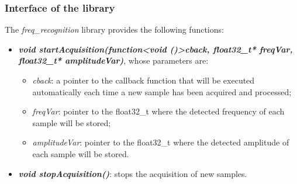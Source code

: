 \subsubsection{Interface of the library}
The \textit{freq\_recognition} library provides the following functions:
\begin{itemize}
	\item \textbf{\textit{void startAcquisition(function\textless void ()\textgreater cback, float32\_t* freqVar, float32\_t* amplitudeVar)}}, whose parameters are:
	\begin{itemize}
		\item \textit{cback}: a pointer to the callback function that will be executed automatically each time a new sample has been acquired and processed;
		\item \textit{freqVar}: pointer to the float32\_t where the detected frequency of each sample will be stored;
		\item \textit{amplitudeVar}: pointer to the float32\_t where the detected amplitude of each sample will be stored.
	\end{itemize}
\item \textbf{\textit{void stopAcquisition()}}: stops the acquisition of new samples.
\end{itemize}

